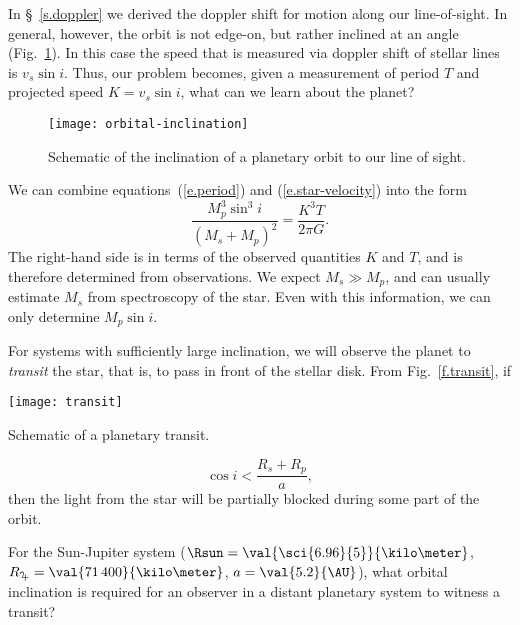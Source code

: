 In \S~\ref{s.doppler} we derived the doppler shift for motion along our line-of-sight.
In general, however, the orbit is not edge-on, but rather inclined at an angle (Fig.~\ref{f.orbital-inclination}).
In this case the speed that is measured via doppler shift of stellar lines is $v_{s}\sin i$.  Thus, our problem becomes, given a measurement of period $T$ and projected speed $K = v_{s}\sin i$, what can we learn about the planet?

\begin{figure}[ht]
\texttt{[image: orbital-inclination]}
\caption[Schematic of the inclination of a planetary orbit]{Schematic of the inclination of a planetary orbit to our line of sight.}
\label{f.orbital-inclination}
\end{figure}

We can combine equations~(\ref{e.period}) and (\ref{e.star-velocity}) into the form
\begin{equation}\label{e.mass-fcn}
	\frac{M_{p}^{3}\sin^{3}i}{(M_{s}+M_{p})^{2}} = \frac{K^{3}T}{2\pi G}.
\end{equation}
The right-hand side is in terms of the observed quantities $K$ and $T$, and is therefore determined from observations.  We expect $M_{s} \gg M_{p}$, and can usually estimate $M_{s}$ from spectroscopy of the star.  Even with this information, we can only determine $M_{p}\sin i$.

For systems with sufficiently large inclination, we will observe the planet to \emph{transit} the star, that is, to pass in front of the stellar disk. From Fig.~\ref{f.transit}, if
\begin{marginfigure}
\texttt{[image: transit]}
\caption[Schematic of a planetary transit]{Schematic of a planetary transit.}
\label{f.transit}
\end{marginfigure}
\[	\cos i < \frac{R_{s}+R_{p}}{a},	\]
then the light from the star will be partially blocked during some part of the orbit.

\begin{exercisebox}
For the Sun-Jupiter system ($\Rsun = \val{\sci{6.96}{5}}{\kilo\meter}$, $R_{\jupiter}=\val{71\,400}{\kilo\meter}$, $a = \val{5.2}{\AU}$), what orbital inclination is required for an observer in a distant planetary system to witness a transit?
\end{exercisebox}

